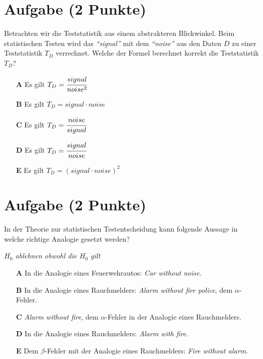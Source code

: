 \documentclass[a4paper, 9pt]{scrartcl}\usepackage[]{graphicx}\usepackage[]{xcolor}
\begin{document}
\section{Aufgabe \hfill (2 Punkte)}

Betrachten wir die Teststatistik aus einem abstrakteren Blickwinkel. Beim
statistischen Testen wird das \textit{"`signal"'} mit dem
\textit{"`noise"'} aus den Daten $D$ zu einer Teststatistik $T_D$ verrechnet. Welche der Formel
berechnet korrekt die Teststatistik $T_D$?



\begin{enumerate}
\item [\textbf{A} \msquare] Es gilt $T_D = \cfrac{signal}{noise^2}$
\item [\textbf{B} \msquare] Es gilt $T_D = signal \cdot noise$
\item [\textbf{C} \msquare] Es gilt $T_D = \cfrac{noise}{signal}$
\item [\textbf{D} \msquare] Es gilt $T_D = \cfrac{signal}{noise}$
\item [\textbf{E} \msquare] Es gilt $T_D = (signal \cdot noise)^2$
\end{enumerate}


\section{Aufgabe \hfill (2 Punkte)}



In der Theorie zur statistischen Testentscheidung kann folgende Aussage
in welche richtige Analogie gesetzt werden?

\begin{center}
\textit{$H_0$ ablehnen obwohl die $H_0$ gilt}
\end{center}



\begin{enumerate}
\item [\textbf{A} \msquare] In die Analogie eines Feuerwehrautos: \textit{Car without noise}.
\item [\textbf{B} \msquare] In die Analogie eines Rauchmelders: \textit{Alarm without fire police}, dem $\alpha$-Fehler.
\item [\textbf{C} \msquare] \textit{Alarm without fire}, dem $\alpha$-Fehler in der Analogie eines Rauchmelders.
\item [\textbf{D} \msquare] In die Analogie eines Rauchmelders: \textit{Alarm with fire}.
\item [\textbf{E} \msquare] Dem $\beta$-Fehler mit der Analogie eines Rauchmelders: \textit{Fire without alarm}.
\end{enumerate}
\end{document}
